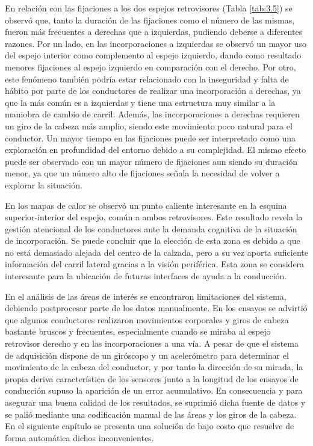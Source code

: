 En relación con las fijaciones a los dos espejos retrovisores (Tabla \ref{tab:3.5}) se observó que, tanto la duración de las fijaciones como el número de las mismas, fueron más frecuentes a derechas que a izquierdas, pudiendo deberse a diferentes razones. Por un lado, en las incorporaciones a izquierdas se observó un mayor uso del espejo interior como complemento al espejo izquierdo, dando como resultado menores fijaciones al espejo izquierdo en comparación con el derecho. Por otro, este fenómeno también podría estar relacionado con la inseguridad y falta de hábito por parte de los conductores de realizar una incorporación a derechas, ya que la más común es a izquierdas y tiene una estructura muy similar a la maniobra de cambio de carril. Además, las incorporaciones a derechas requieren un giro de la cabeza más amplio, siendo este movimiento poco natural para el conductor. Un mayor tiempo en las fijaciones puede ser interpretado como una exploración en profundidad del entorno debido a su complejidad. El mismo efecto puede ser observado con un mayor número de fijaciones aun siendo su duración menor, ya que un número alto de fijaciones señala la necesidad de volver a explorar la situación.

En los mapas de calor se observó un punto caliente interesante en la esquina superior-interior del espejo, común a ambos retrovisores. Este resultado revela la gestión atencional de los conductores ante la demanda cognitiva de la situación de incorporación. Se puede concluir que la elección de esta zona es debido a que no está demasiado alejada del centro de la calzada, pero a su vez aporta suficiente información del carril lateral gracias a la visión periférica. Esta zona se considera interesante para la ubicación de futuras interfaces de ayuda a la conducción.

En el análisis de las áreas de interés se encontraron limitaciones del sistema, debiendo postprocesar parte de los datos manualmente. En los ensayos se advirtió que algunos conductores realizaron movimientos corporales y giros de cabeza bastante bruscos y frecuentes, especialmente cuando se miraba al espejo retrovisor derecho y en las incorporaciones a una vía. A pesar de que el sistema de adquisición dispone de un giróscopo y un acelerómetro para determinar el movimiento de la cabeza del conductor, y por tanto la dirección de su mirada, la propia deriva característica de los sensores junto a la longitud de los ensayos de conducción supuso la aparición de un error acumulativo. En consecuencia y para asegurar una buena calidad de los resultados, se suprimió dicha fuente de datos y se palió mediante una codificación manual de las áreas y los giros de la cabeza. En el siguiente capítulo se presenta una solución de bajo costo que resuelve de forma automática dichos inconvenientes. 

